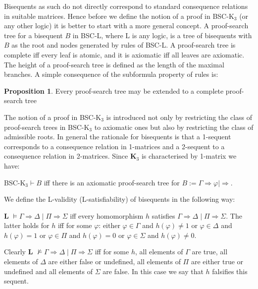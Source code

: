 \documentclass[10pt,a4paper]{article}
\theoremstyle{definition}
\newtheorem{proposition}{ \textbf{Proposition}}
\newcommand{\3}{\vspace{.3in}}
\newcommand{\2}{\vspace{.2in}}
\newcommand{\1}{\vspace{.1in}}
\newcommand{\5}{\vspace{.05in}}
\begin{document}
Bisequents as such do not directly correspond to standard consequence relations in suitable matrices. Hence 
before we define the notion of a proof in BSC-K$_3$ (or any other logic) it is better to start with a more general concept. A proof-search tree for a bisequent $B$ in BSC-L, where L is any logic, is a tree of bisequents with $B$ as the root and nodes generated by rules of BSC-L. A proof-search tree is complete iff every leaf is atomic, and it is axiomatic iff all leaves are axiomatic. The height of a proof-search tree is defined as the length of the maximal branches. A simple consequence of the subformula property of rules is:


\begin{proposition}
	Every proof-search tree may be extended to a complete proof-search tree
\end{proposition}


The notion of a proof in BSC-K$_3$ is introduced not only by restricting the class of proof-search trees in BSC-K$_3$ to axiomatic ones but also  by restricting the class of admissible roots. In general the rationale for bisequents is that a 1-sequent corresponds to a consequence relation in 1-matrices and a 2-sequent to a consequence relation in 2-matrices. Since {\bf K$_3$} is characterised by 1-matrix we have:

\1

BSC-K$_3  \vdash B$ iff there is an axiomatic proof-search tree for $B := \Gamma\Rightarrow\varphi \mid \Rightarrow$.

\1

We define the L-validity (L-satisfiability) of bisequents in the following way:

\1

{\bf L} $\models\Gamma\Rightarrow\Delta \mid \Pi\Rightarrow\Sigma$ iff 
every homomorphism $h$ satisfies $\Gamma\Rightarrow\Delta \mid \Pi\Rightarrow\Sigma$. The latter holds for $h$ iff for some $\varphi$: either $\varphi\in \Gamma$ and $h(\varphi)\neq 1$ or $\varphi\in \Delta$ and $h(\varphi)=1$ or $\varphi\in \Pi$ and $h(\varphi)=0$ or $\varphi\in \Sigma$ and $h(\varphi)\neq 0$.

\1

Clearly {\bf L} $\not \models\Gamma\Rightarrow\Delta \mid \Pi\Rightarrow\Sigma$ iff for some $h$, all elements of $\Gamma$ are true, all elements of $\Delta$ are either false or undefined, all elements of $\Pi$ are either true or undefined and all elements of $\Sigma$ are false. In this case we say that $h$ falsifies this sequent.
\end{document}
